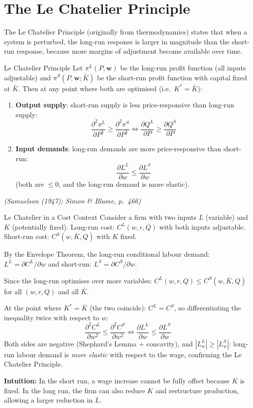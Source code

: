\documentclass[12pt, a4paper]{article}
\theoremstyle{definition}
\newcommand{\pp}[2]{\dfrac{\partial #1}{\partial #2}}
\begin{document}
\section{The Le Chatelier Principle}

The Le Chatelier Principle (originally from thermodynamics) states that when a
system is perturbed, the long-run response is larger in magnitude than the
short-run response, because more margins of adjustment become available over
time.

\begin{thmbox}{Le Chatelier Principle}
Let $\pi^L(P,\mathbf{w})$ be the long-run profit function (all inputs
adjustable) and $\pi^S(P,\mathbf{w}; \bar K)$ be the short-run profit
function with capital fixed at $\bar K$. Then at any point where both are
optimised (i.e.\ $K^* = \bar K$):
\begin{enumerate}
  \item \textbf{Output supply}: short-run supply is less price-responsive
        than long-run supply:
        \[
          \frac{\partial^2\pi^L}{\partial P^2}
          \geq \frac{\partial^2\pi^S}{\partial P^2}
          \iff
          \pp{Q^L}{P} \geq \pp{Q^S}{P}
        \]
  \item \textbf{Input demands}: long-run demands are more price-responsive
        than short-run:
        \[
          \pp{L^L}{w} \leq \pp{L^S}{w}
        \]
        (both are $\leq 0$, and the long-run demand is more elastic).
\end{enumerate}
\emph{(Samuelson (1947); Simon \& Blume, p.\ 466)}
\end{thmbox}

\begin{exbox}{Le Chatelier in a Cost Context}
Consider a firm with two inputs $L$ (variable) and $K$ (potentially fixed).
Long-run cost: $C^L(w,r,Q)$ with both inputs adjustable.
Short-run cost: $C^S(w,\bar K, Q)$ with $K$ fixed.

By the Envelope Theorem, the long-run conditional labour demand:
$L^L = \partial C^L/\partial w$ and short-run: $L^S = \partial C^S/\partial w$.

Since the long-run optimises over more variables:
$C^L(w,r,Q) \leq C^S(w,\bar K,Q)$ for all $(w,r,Q)$ and all $\bar K$.

At the point where $K^*=\bar K$ (the two coincide):
$C^L = C^S$, so differentiating the inequality twice with respect to $w$:
\[
  \pp{^2 C^L}{w^2} \leq \pp{^2 C^S}{w^2}
  \iff
  \pp{L^L}{w} \leq \pp{L^S}{w}
\]
Both sides are negative (Shephard's Lemma + concavity), and $|{L^L_w}| \geq |{L^S_w}|$:
long-run labour demand is \emph{more elastic} with respect to the wage, confirming the Le Chatelier Principle.

\textbf{Intuition:} In the short run, a wage increase cannot be fully offset
because $K$ is fixed. In the long run, the firm can also reduce $K$ and
restructure production, allowing a larger reduction in $L$.
\end{exbox}
\end{document}

